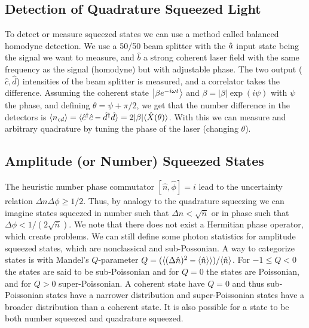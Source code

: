\subsection{Detection of Quadrature Squeezed Light}
To detect or measure squeezed states we can use a method called balanced homodyne detection. We use a 50/50 beam splitter with the $\hat{a}$ input state being the signal we want to measure, and $\hat{b}$ a strong coherent laser field with the same frequency as the signal (homodyne) but with adjustable phase. The two output ($\hat{c},\hat{d}$) intensities of the beam splitter is measured, and a correlator takes the difference. Assuming the coherent state $\ket{\beta e^{-i\omega t}}$ and $\beta = |\beta|\exp(i\psi)$ with $\psi$ the phase, and defining $\theta = \psi + \pi/2$, we get that the number difference in the detectors is  $\lineexpval{n_{cd}} = \lineexpval{\hat{c}^\dagger \hat{c} - \hat{d}^\dagger\hat{d}} = 2|\beta| \lineexpval{\Xgen(\theta)}$. With this we can measure and arbitrary quadrature by tuning the phase of the laser (changing $\theta$).

\subsection{Amplitude (or Number) Squeezed States}
The heuristic number phase commutator $[\hat{n}, \hat{\phi}] = i$ lead to the uncertainty relation $\Delta n \Delta \phi \geq 1/2$. Thus, by analogy to the quadrature squeezing we can imagine states squeezed in number such that $\Delta n < \sqrt{\bar{n}}$ or in phase such that $\Delta \phi < 1 / (2\sqrt{\bar{n}})$. We note that there does not exist a Hermitian phase operator, which create problems. We can still define some photon statistics for amplitude squeezed states, which are nonclassical and sub-Possonian.  A way to categorize states is with Mandel's $Q$-parameter $Q = (\langle (\Delta \hat{n})^2 - \langle \hat{n} \rangle \rangle)/\langle \hat{n} \rangle$. For $-1 \leq Q < 0$ the states are said to be sub-Poissonian and for $Q = 0$ the states are Poissonian, and for $Q > 0$ super-Poissonian. A coherent state have $Q=0$ and thus sub-Poissonian states have a narrower distribution and super-Poissonian states have a broader distribution than a coherent state. It is also possible for a state to be both number squeezed and quadrature squeezed.

